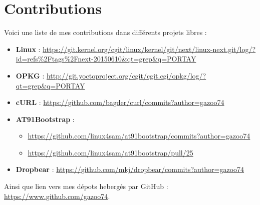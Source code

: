 \documentclass[a4paper]{article}
\begin{document}
\appendix
\section{Contributions}
Voici une liste de mes contributions dans différents projets libres :
\begin{itemize}
\item \textbf{Linux} : \url{https://git.kernel.org/cgit/linux/kernel/git/next/linux-next.git/log/?id=refs\%2Ftags\%2Fnext-20150610&qt=grep&q=PORTAY}
\item \textbf{OPKG} : \url{http://git.yoctoproject.org/cgit/cgit.cgi/opkg/log/?qt=grep&q=PORTAY}
\item \textbf{cURL} : \url{https://github.com/bagder/curl/commits?author=gazoo74}
\item \textbf{AT91Bootstrap} :
\begin{itemize}
\item \url{https://github.com/linux4sam/at91bootstrap/commits?author=gazoo74}
\item \url{https://github.com/linux4sam/at91bootstrap/pull/25}
\end{itemize}
\item \textbf{Dropbear} : \url{https://github.com/mkj/dropbear/commits?author=gazoo74}
\end{itemize}
Ainsi que lien vers mes dépots hebergés par GitHub : \url{https://www.github.com/gazoo74}.
\end{document}
